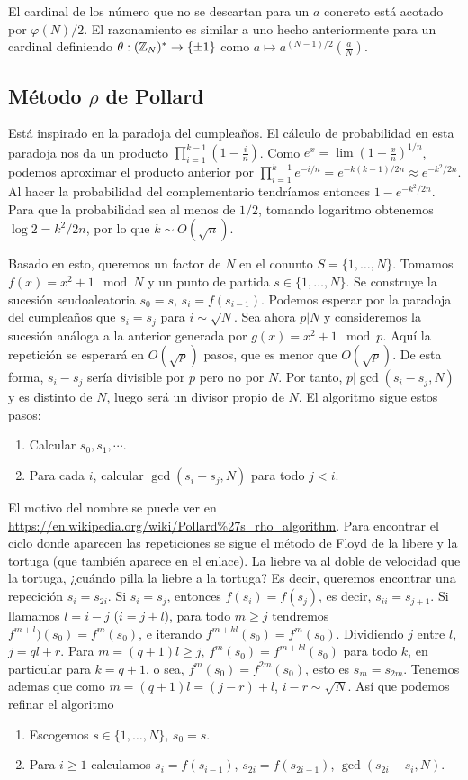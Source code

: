 \documentclass[CR.tex]{subfiles}
\begin{document}
El cardinal de los número que no se descartan para un $a$ concreto está acotado por $\varphi(N)/2$. El razonamiento es similar a uno hecho anteriormente para un cardinal definiendo $\theta:(\mathbb{Z}_N)^*\to\{\pm 1\}$ como $a\mapsto a^{(N-1)/2}(\frac{a}{N})$. 

\subsection{Método $\rho$ de Pollard}
Está inspirado en la paradoja del cumpleaños. El cálculo de probabilidad en esta paradoja nos da un producto $\prod_{i=1}^{k-1}(1-\frac{i}{n})$. Como $e^x=\lim (1+\frac{x}{n})^{1/n}$, podemos aproximar el producto anterior por $\prod_{i=1}^{k-1}e^{-i/n}=e^{-k(k-1)/2n}\approx e^{-k^2/2n}$. Al hacer la probabilidad del complementario tendríamos entonces $1-e^{-k^2/2n}$. Para que la probabilidad sea al menos de $1/2$, tomando logaritmo obtenemos $\log 2=k^2/2n$, por lo que $k\sim O(\sqrt{n})$. 

Basado en esto, queremos un factor de $N$ en el conunto $S=\{1,\dots, N\}$. Tomamos $f(x)=x^2+1\mod N$ y un punto de partida $s\in\{1,\dots, N\}$. Se construye la sucesión seudoaleatoria $s_0=s$, $s_i=f(s_{i-1})$. Podemos esperar por la paradoja del cumpleaños que $s_i=s_j$ para $i\sim\sqrt{N}$. Sea ahora $p|N$ y consideremos la sucesión análoga a la anterior generada por $g(x)=x^2+1\mod p$. Aquí la repetición se esperará en $O(\sqrt{p})$ pasos, que es menor que $O(\sqrt{p})$. De esta forma, $s_i-s_j$ sería divisible por $p$ pero no por $N$. Por tanto, $p|\gcd(s_i-s_j,N)$ y es distinto de $N$, luego será un divisor propio de $N$. El algoritmo sigue estos pasos:

\begin{enumerate}
\item Calcular $s_0,s_1,\cdots$.
\item Para cada $i$, calcular $\gcd(s_i-s_j,N)$ para todo $j<i$. 
\end{enumerate}
El motivo del nombre se puede ver en \url{https://en.wikipedia.org/wiki/Pollard\%27s_rho_algorithm}. Para encontrar el ciclo donde aparecen las repeticiones se sigue el método de Floyd de la libere y la tortuga (que también aparece en el enlace). La liebre va al doble de velocidad que la tortuga, ¿cuándo pilla la liebre a la tortuga? Es decir, queremos encontrar una repecición $s_i=s_{2i}$. Si $s_i=s_j$, entonces $f(s_i)=f(s_j)$, es decir, $s_{i
i}=s_{j+1}$. Si llamamos $l=i-j$ ($i=j+l$), para todo $m\geq j$ tendremos $f^{m+l})(s_0)=f^m(s_0)$, e iterando $f^{m+kl}(s_0)=f^m(s_0)$.  Dividiendo $j$ entre $l$, $j=ql+r$. Para $m=(q+1)l\geq j$, $f^m(s_0)=f^{m+kl}(s_0)$ para todo $k$, en particular para $k=q+1$, o sea, $f^m(s_0)=f^{2m}(s_0)$, esto es $s_m=s_{2m}$. Tenemos ademas que como $m=(q+1)l=(j-r)+l$, $i-r\sim \sqrt{N}$. Así que podemos refinar el algoritmo
\begin{enumerate}
\item Escogemos $s\in\{1,\dots, N\}$, $s_0=s$. 
\item Para $i\geq 1$ calculamos $s_i=f(s_{i-1})$, $s_{2i}=f(s_{2i-1})$, $\gcd(s_{2i}-s_i,N)$.
\end{enumerate}
\end{document}
